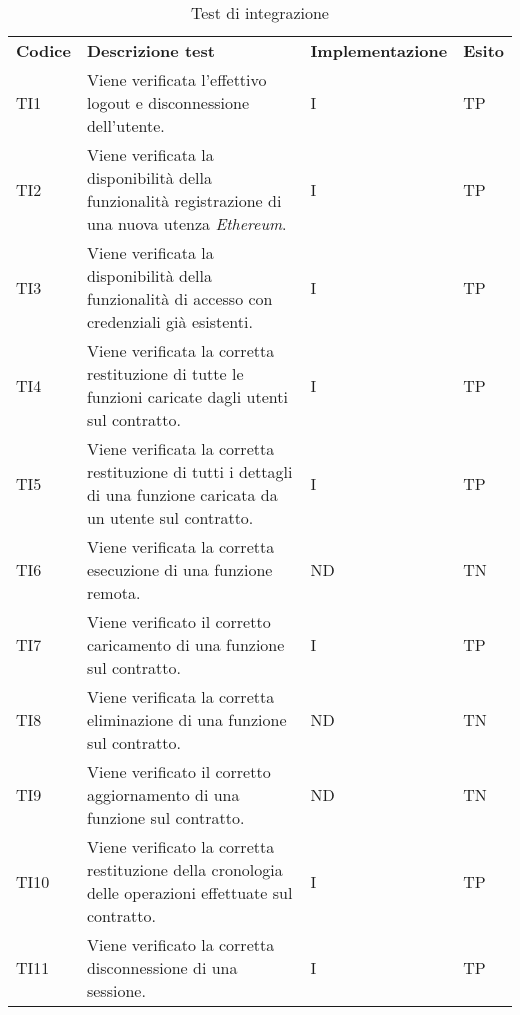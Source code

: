 \begin{longtable}{|C{1.5cm}|C{8cm}|C{3cm}|C{1cm}|}

	\caption{Test di integrazione}\\
	\hline

	\textbf{Codice} & \textbf{Descrizione test}  & \textbf{Implementazione}& \textbf{Esito}
	\tabularnewline
	\endfirsthead
	TI1 &
	Viene verificata l'effettivo logout e disconnessione dell'utente.  &
	I & TP\\

	TI2 &
	Viene verificata la disponibilità della funzionalità registrazione di una nuova utenza \textit{Ethereum\glos}.  &
	I & TP\\

	TI3 &
	Viene verificata la disponibilità della funzionalità di accesso con credenziali già esistenti.  &
	I & TP\\

	TI4 &
	Viene verificata la corretta restituzione di tutte le funzioni caricate dagli utenti sul contratto.  &
	I & TP \\

	TI5 &
	Viene verificata la corretta restituzione di tutti i dettagli di una funzione caricata da un utente sul contratto.  &
	I & TP\\

	TI6 &
	Viene verificata la corretta esecuzione di una funzione remota.  &
	ND & TN\\

	TI7 &
	Viene verificato il corretto caricamento di una funzione sul contratto.  &
	I & TP \\

	TI8 &
	Viene verificata la corretta eliminazione di una funzione sul contratto.  &
	ND & TN\\

	TI9 &
	Viene verificato il corretto aggiornamento di una funzione sul contratto.  &
	ND & TN\\

	TI10 &
	Viene verificato la corretta restituzione della cronologia delle operazioni effettuate sul contratto.  &
	I & TP\\

	TI11 &
	Viene verificato la corretta disconnessione di una sessione.  &
	I & TP\\

\end{longtable}

\newpage
